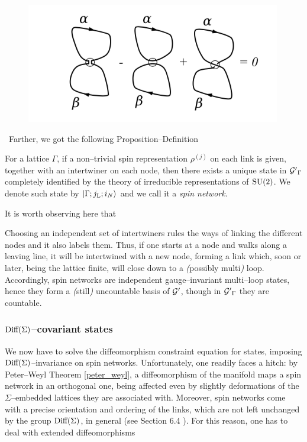 \begin{figure}[ht]
    \centering
    \includegraphics[scale=0.6]{images/multiloops.png}
\end{figure}
 
 \,\newline
 Farther, we got the following Proposition--Definition
\begin{defi}
    For a lattice $\Gamma$, if a non--trivial spin representation $\rho^{(j)}$ on each link is given, together with an intertwiner on each node, then there exists a unique state in ${\mathcal{G}'}_\Gamma$ completely identified by the theory of irreducible representations of $\text{\normalfont SU}(2)$. We denote such state by $\left| \Gamma;j_{\text{\normalfont L}};i_N \right >$ and we call it a \emph{spin network}.
\end{defi}
It is worth observing here that
\begin{remark}
    Choosing an independent set of intertwiners rules the ways of linking the different nodes and it also labels them. Thus, if one starts at a node and walks along a leaving line, it will be intertwined with a new node, forming a link which, soon or later, being the lattice finite, will close down to a \emph{(}possibly multi\emph{)} loop. Accordingly, spin networks are independent gauge--invariant multi--loop states, hence they form a \emph{(}still\emph{)} uncountable basis of $\mathcal{G}'$, though in ${\mathcal{G}'}_\Gamma$ they are countable.
\end{remark}


\subsubsection{\texorpdfstring{$\text{\normalfont Diff}(\Sigma)$}{a}--covariant states}
We now have to solve the diffeomorphism constraint equation for states, imposing $\text{\normalfont Diff}(\Sigma)$--invariance on spin networks. Unfortunately, one readily faces a hitch: by Peter--Weyl Theorem \ref{peter_weyl}, a diffeomorphism of the manifold maps a spin network in an orthogonal one, being affected even by slightly deformations of the $\Sigma$--embedded lattices they are associated with. Moreover, spin networks come with a precise orientation and ordering of the links, which are not left unchanged by the group $\text{\normalfont Diff}(\Sigma)$, in general (see Section 6.4 \cite{rov1}). For this reason, one has to deal with extended diffeomorphisms


